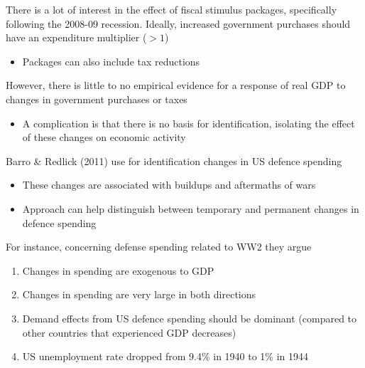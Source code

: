 \documentclass{beamer}
\begin{document}
\begin{frame}
 There is a lot of interest in the effect of fiscal stimulus packages, specifically following the 2008-09 recession. 
 Ideally, increased government purchases should have an expenditure multiplier ($>1$)
 \begin{itemize}
   \item Packages can also include tax reductions
 \end{itemize}
 \medskip
 However, there is little to no empirical evidence for a response of real GDP to changes in government purchases or taxes
 \begin{itemize}
   \item A complication is that there is no basis for identification, isolating the effect of these changes on economic activity
 \end{itemize}
\end{frame}

\begin{frame}
  Barro \& Redlick (2011) use for identification changes in US defence spending
  \begin{itemize}
    \item These changes are associated with buildups and aftermaths of wars
    \item Approach can help distinguish between temporary and permanent changes in defence spending
  \end{itemize}
\end{frame}

\begin{frame}
  For instance, concerning defense spending related to WW2 they argue 
  \begin{enumerate}
    \item Changes in spending are exogenous to GDP
    \item Changes in spending are very large in both directions
    \item Demand effects from US defence spending should be dominant (compared to other countries that experienced GDP decreases)
    \item US unemployment rate dropped from 9.4\% in 1940 to 1\% in 1944
  \end{enumerate}
\end{frame}
\end{document}
